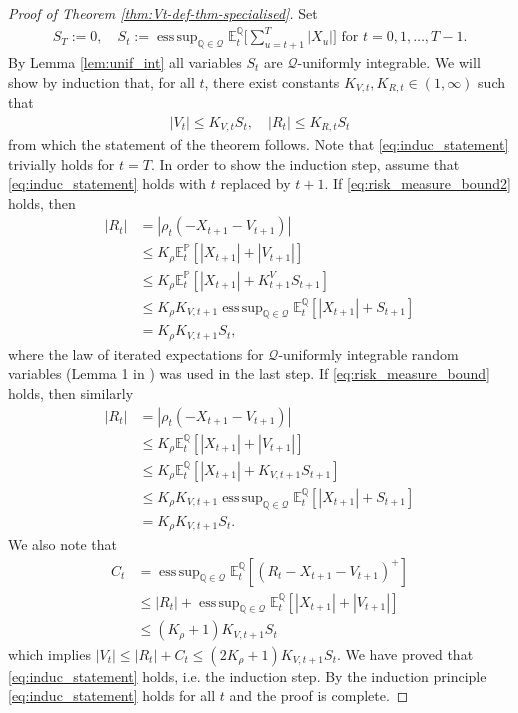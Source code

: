 \documentclass[11pt,a4paper]{article}
\newcommand{\E}{\mathbb{E}}
\DeclareMathOperator*{\esssup}{ess\,sup}
\renewcommand{\P}{\mathbb{P}}
\newcommand{\Q}{\mathbb{Q}}
\newcommand{\calQ}{\mathcal{Q}}
\begin{document}
\begin{proof}[Proof of Theorem \ref{thm:Vt-def-thm-specialised}]
Set 
\begin{align*}
S_T:=0, \quad S_t:=\esssup_{\Q\in\calQ}\E^{\Q}_t\bigg[\sum_{u=t+1}^T |X_u|\bigg] \text{ for } t=0,1,\dots,T-1.
\end{align*}
By Lemma \ref{lem:unif_int} all variables $S_t$ are $\calQ$-uniformly integrable. 
We will show by induction that, for all $t$, there exist constants $K_{V,t},K_{R,t}\in (1,\infty)$ such that   
\begin{align}\label{eq:induc_statement}
|V_{t}| \leq K_{V,t}S_{t}, \quad 
|R_{t}| \leq  K_{R,t}S_{t} 
\end{align}
from which the statement of the theorem follows. Note that \eqref{eq:induc_statement} trivially holds for $t=T$. In order to show the induction step, assume that \eqref{eq:induc_statement} holds with $t$ replaced by $t+1$. 
If \eqref{eq:risk_measure_bound2} holds, then 
\begin{align*}
|R_{t}| &= |\rho_t(-X_{t+1}-V_{t+1})| \\
&\leq K_{\rho} \E^\P_t[|X_{t+1}|+|V_{t+1}|]\\
&\leq K_{\rho} \E^\P_t[|X_{t+1}| +K^V_{t+1} S_{t+1} ] \\
&\leq K_{\rho} K_{V,t+1} \esssup_{\Q \in \calQ} \E^\Q_t[|X_{t+1}|+S_{t+1}] \\
&= K_{\rho} K_{V,t+1}S_t,
\end{align*}
where the law of iterated expectations for $\calQ$-uniformly integrable random variables (Lemma 1 in \cite{Riedel-09}) was used in the last step. 
If \eqref{eq:risk_measure_bound} holds, then similarly 
\begin{align*}
|R_{t}| &= |\rho_t(-X_{t+1}-V_{t+1})| \\
&\leq K_{\rho} \E^\Q_t[|X_{t+1}|+|V_{t+1}|]\\
&\leq K_{\rho} \E^\Q_t[|X_{t+1}| +K_{V,t+1} S_{t+1} ] \\
&\leq K_{\rho} K_{V,t+1} \esssup_{\Q \in \calQ} \E^\Q_t[|X_{t+1}|+S_{t+1}] \\
&= K_{\rho} K_{V,t+1}S_t.
\end{align*}
We also note that 
\begin{align*}
C_t&=\esssup_{\Q \in \calQ} \E^\Q_t[(R_t-X_{t+1}-V_{t+1})^+]\\
&\leq |R_{t}|+\esssup_{\Q \in \calQ} \E^\Q_t[|X_{t+1}|+|V_{t+1}|]\\
& \leq (K_{\rho}+1) K_{V,t+1}S_t
\end{align*}
which implies $|V_t|\leq |R_t|+C_t\leq (2K_{\rho}+1)K_{V,t+1}S_t$.
We have proved that \eqref{eq:induc_statement} holds, i.e. the induction step. By the induction principle \eqref{eq:induc_statement} holds for all $t$ and the proof is complete. 
\end{proof}
\end{document}
